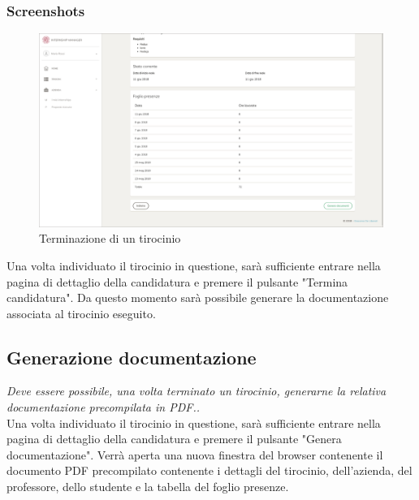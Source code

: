 \subsubsection{Screenshots}
\begin{figure}[H]
	\centering
	\includegraphics[width=1\textwidth]{Figs/screenshots/internshipended}     
	\caption[Screenshot: terminazione di un tirocinio]{Terminazione di un tirocinio}
	\label{fig:screenshot:9}
\end{figure}

\noindent
Una volta individuato il tirocinio in questione, sarà sufficiente entrare nella pagina di dettaglio della candidatura e premere il pulsante "Termina candidatura". Da questo momento sarà possibile generare la documentazione associata al tirocinio eseguito.

\pagebreak
\subsection{Generazione documentazione}
\textit{Deve essere possibile, una volta terminato un tirocinio, generarne la relativa documentazione precompilata in PDF..} \\

\noindent
Una volta individuato il tirocinio in questione, sarà sufficiente entrare nella pagina di dettaglio della candidatura e premere il pulsante "Genera documentazione". Verrà aperta una nuova finestra del browser contenente il documento PDF precompilato contenente i dettagli del tirocinio, dell'azienda, del professore, dello studente e la tabella del foglio presenze.

